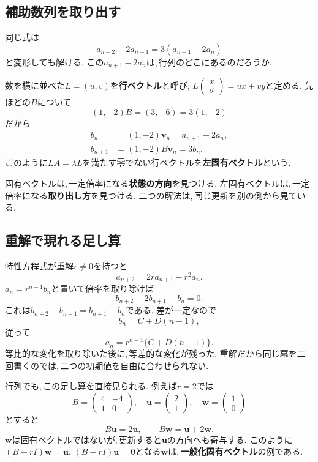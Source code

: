 \subsection{補助数列を取り出す}

同じ式は
\[
 a_{n+2}-2a_{n+1}
 =3(a_{n+1}-2a_n)
\]
と変形しても解ける.
この$a_{n+1}-2a_n$は,\,行列のどこにあるのだろうか.

数を横に並べた$L=(u,v)$を\textbf{行ベクトル}と呼び,
$L\begin{pmatrix}x\\y\end{pmatrix}=ux+vy$と定める.
先ほどの$B$について
\[
 (1,-2)B=(3,-6)=3(1,-2)
\]
だから
\[
 \begin{aligned}
 b_n&=(1,-2)\boldsymbol v_n=a_{n+1}-2a_n,\\
 b_{n+1}&=(1,-2)B\boldsymbol v_n=3b_n.
 \end{aligned}
\]
このように$LA=\lambda L$を満たす零でない行ベクトルを\textbf{左固有ベクトル}という.

固有ベクトルは,\,一定倍率になる\textbf{状態の方向}を見つける.
左固有ベクトルは,\,一定倍率になる\textbf{取り出し方}を見つける.
二つの解法は,\,同じ更新を別の側から見ている.

\subsection{重解で現れる足し算}\label{節：重解と足し算}

特性方程式が重解$r\ne0$を持つと
\[
 a_{n+2}=2r a_{n+1}-r^2a_n.
\]
$a_n=r^{n-1}b_n$と置いて倍率を取り除けば
\[
 b_{n+2}-2b_{n+1}+b_n=0.
\]
これは$b_{n+2}-b_{n+1}=b_{n+1}-b_n$である.
差が一定なので
\[
 b_n=C+D(n-1),
\]
従って
\[
 a_n=r^{n-1}\{C+D(n-1)\}.
\]
等比的な変化を取り除いた後に,\,等差的な変化が残った.
重解だから同じ冪を二回書くのでは,\,二つの初期値を自由に合わせられない.

行列でも,\,この足し算を直接見られる.
例えば$r=2$では
\[
 B=\begin{pmatrix}4&-4\\1&0\end{pmatrix},
 \quad
 \boldsymbol u=\begin{pmatrix}2\\1\end{pmatrix},
 \quad
 \boldsymbol w=\begin{pmatrix}1\\0\end{pmatrix}
\]
とすると
\[
 B\boldsymbol u=2\boldsymbol u,\qquad
 B\boldsymbol w=\boldsymbol u+2\boldsymbol w.
\]
$\boldsymbol w$は固有ベクトルではないが,\,更新すると$\boldsymbol u$の方向へも寄与する.
このように$(B-rI)\boldsymbol w=\boldsymbol u$,
$(B-rI)\boldsymbol u=\boldsymbol0$となる$\boldsymbol w$は,\,\textbf{一般化固有ベクトル}の例である.


